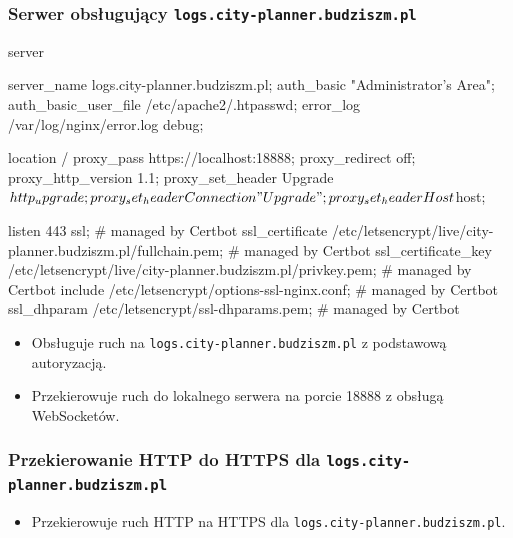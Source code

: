 \subsubsection{Serwer obsługujący \texttt{logs.city-planner.budziszm.pl}}
\begin{longlisting}[language=nginx,label={lst:n9}]
server {
  server_name logs.city-planner.budziszm.pl;
  auth_basic           "Administrator's Area";
  auth_basic_user_file /etc/apache2/.htpasswd;
  error_log  /var/log/nginx/error.log debug;

  location / {
    proxy_pass https://localhost:18888;
    proxy_redirect off;
    proxy_http_version 1.1;
    proxy_set_header Upgrade $http_upgrade;
    proxy_set_header Connection "Upgrade";
    proxy_set_header Host $host;
  }

  listen 443 ssl; # managed by Certbot
  ssl_certificate /etc/letsencrypt/live/city-planner.budziszm.pl/fullchain.pem; # managed by Certbot
  ssl_certificate_key /etc/letsencrypt/live/city-planner.budziszm.pl/privkey.pem; # managed by Certbot
  include /etc/letsencrypt/options-ssl-nginx.conf; # managed by Certbot
  ssl_dhparam /etc/letsencrypt/ssl-dhparams.pem; # managed by Certbot
}
\end{longlisting}
\begin{itemize}
    \item Obsługuje ruch na \texttt{logs.city-planner.budziszm.pl} z podstawową autoryzacją.
    \item Przekierowuje ruch do lokalnego serwera na porcie 18888 z obsługą WebSocketów.
\end{itemize}

\subsubsection{Przekierowanie HTTP do HTTPS dla \texttt{logs.city-planner.budziszm.pl}}
\begin{itemize}
    \item Przekierowuje ruch HTTP na HTTPS dla \texttt{logs.city-planner.budziszm.pl}.
\end{itemize}

